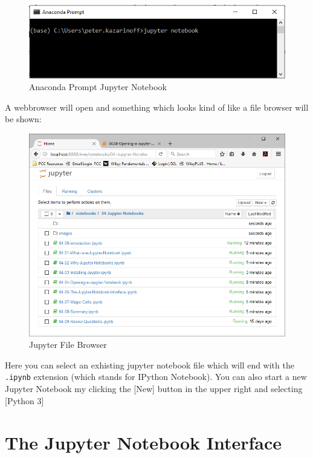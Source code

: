 \documentclass{book}
\makeatletter
\def\maxwidth{\ifdim\Gin@nat@width>\linewidth\linewidth
    \else\Gin@nat@width\fi}
\let\Oldincludegraphics\includegraphics
\renewcommand{\includegraphics}[1]{\Oldincludegraphics[width=.8\maxwidth]{#1}}
\makeatother
\begin{document}
\begin{figure}
\centering
\includegraphics{images/Anaconda_Prompt_Jupyter_Notebook.png}
\caption{Anaconda Prompt Jupyter Notebook}
\end{figure}

A webbrowser will open and something which looks kind of like a file
browser will be shown:

\begin{figure}
\centering
\includegraphics{images/Jupyter_Home_Browser.png}
\caption{Jupyter File Browser}
\end{figure}

Here you can select an exhisting jupyter notebook file which will end
with the \lstinline!.ipynb! extension (which stands for IPython
Notebook). You can also start a new Jupyter Notebook my clicking the
{[}New{]} button in the upper right and selecting {[}Python 3{]}

    \section{The Jupyter Notebook
Interface}\label{the-jupyter-notebook-interface}
\end{document}
